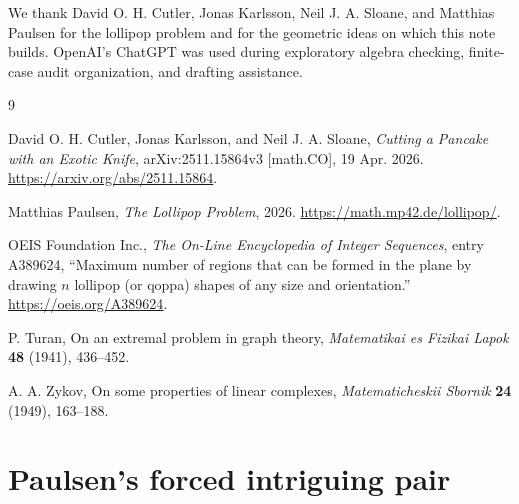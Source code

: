 \documentclass[12pt]{article}
\theoremstyle{plain}
\theoremstyle{definition}
\theoremstyle{remark}
\begin{document}
We thank David O. H. Cutler, Jonas Karlsson, Neil J. A. Sloane, and Matthias
Paulsen for the lollipop problem and for the geometric ideas on which this
note builds.  OpenAI's ChatGPT was used during exploratory algebra checking,
finite-case audit organization, and drafting assistance.
\begin{thebibliography}{9}

David O. H. Cutler, Jonas Karlsson, and Neil J. A. Sloane,
\emph{Cutting a Pancake with an Exotic Knife},
arXiv:2511.15864v3 [math.CO], 19 Apr. 2026.
\url{https://arxiv.org/abs/2511.15864}.

Matthias Paulsen,
\emph{The Lollipop Problem}, 2026.
\url{https://math.mp42.de/lollipop/}.

OEIS Foundation Inc.,
\emph{The On-Line Encyclopedia of Integer Sequences}, entry A389624,
``Maximum number of regions that can be formed in the plane by drawing
\(n\) lollipop (or qoppa) shapes of any size and orientation.''
\url{https://oeis.org/A389624}.

P. Turan,
On an extremal problem in graph theory,
\emph{Matematikai es Fizikai Lapok} \textbf{48} (1941), 436--452.

A. A. Zykov,
On some properties of linear complexes,
\emph{Matematicheskii Sbornik} \textbf{24} (1949), 163--188.

\end{thebibliography}

\clearpage
\appendix

\section{Paulsen's forced intriguing pair}\label{app:paulsen}
\end{document}
